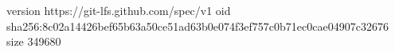 version https://git-lfs.github.com/spec/v1
oid sha256:8c02a14426bef65b63a50ce51ad63b0e074f3ef757c0b71ec0cae04907c32676
size 349680
